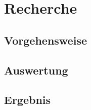 \chapter{Recherche}
\label{ch:Recherche}

\section{Vorgehensweise}
\label{sec:Vorgehensweise}


\section{Auswertung}
\label{sec:Auswertung}


\section{Ergebnis}
\label{sec:Ergebnis}